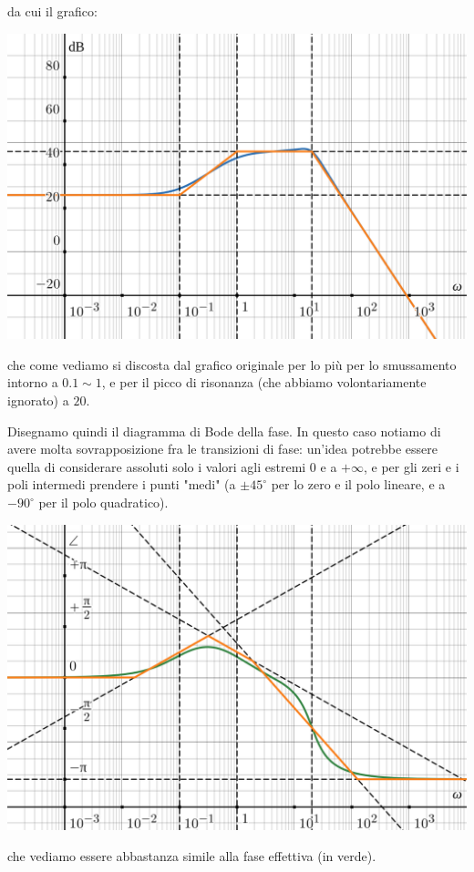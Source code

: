 \documentclass[a4paper,11pt]{article}
\begin{document}
\par\bigskip

\noindent
\begin{minipage}{\textwidth}
da cui il grafico:

\begin{center}
	\includegraphics[scale=0.3]{../figures/exerc_bode.png}
\end{center}
\end{minipage}

\par\bigskip

che come vediamo si discosta dal grafico originale per lo più per lo smussamento intorno a $0.1 \sim 1$, e per il picco di risonanza (che abbiamo volontariamente ignorato) a $20$.

\par\smallskip

Disegnamo quindi il diagramma di Bode della fase.
In questo caso notiamo di avere molta sovrapposizione fra le transizioni di fase: un'idea potrebbe essere quella di considerare assoluti solo i valori agli estremi $0$ e a $+\infty$, e per gli zeri e i poli intermedi prendere i punti "medi" (a $\pm 45^\circ$ per lo zero e il polo lineare, e a $-90^\circ$ per il polo quadratico).

\par\bigskip

\noindent
\begin{minipage}{\textwidth}

\begin{center}
	\includegraphics[scale=0.3]{../figures/exerc_bode_phase.png}
\end{center}
\end{minipage}

\par\bigskip

che vediamo essere abbastanza simile alla fase effettiva (in verde).
\end{document}
